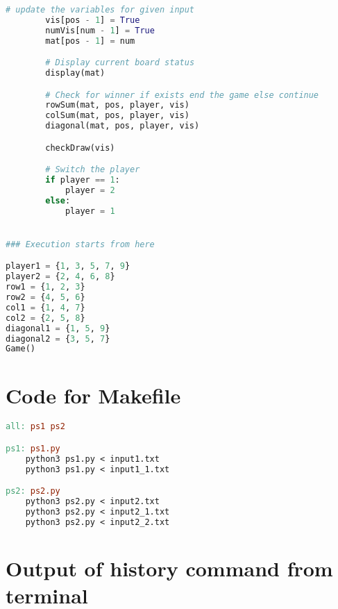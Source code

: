\documentclass[11pt,oneside]{book}
\begin{document}
\begin{appendices}
\begin{lstlisting}[language=Python, frame='single']
		# update the variables for given input
		vis[pos - 1] = True
		numVis[num - 1] = True 
		mat[pos - 1] = num

		# Display current board status
		display(mat)

		# Check for winner if exists end the game else continue
		rowSum(mat, pos, player, vis)
		colSum(mat, pos, player, vis)
		diagonal(mat, pos, player, vis)	

		checkDraw(vis)

		# Switch the player
		if player == 1:
			player = 2
		else:
			player = 1


### Execution starts from here

player1 = {1, 3, 5, 7, 9}
player2 = {2, 4, 6, 8}
row1 = {1, 2, 3}
row2 = {4, 5, 6}
col1 = {1, 4, 7}
col2 = {2, 5, 8}
diagonal1 = {1, 5, 9}
diagonal2 = {3, 5, 7}
Game()

\end{lstlisting}

\chapter{Code for Makefile}

\begin{lstlisting}[language=make, frame='single']
all: ps1 ps2

ps1: ps1.py
	python3 ps1.py < input1.txt
	python3 ps1.py < input1_1.txt

ps2: ps2.py
	python3 ps2.py < input2.txt
	python3 ps2.py < input2_1.txt
	python3 ps2.py < input2_2.txt

\end{lstlisting}


\chapter{Output of history command from terminal}


\end{appendices}

\printbibliography
\end{document}
